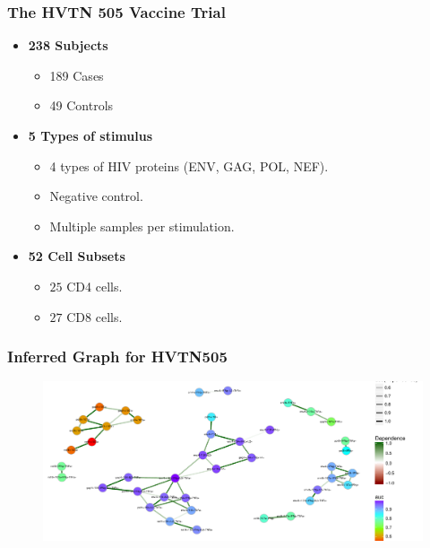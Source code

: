 \documentclass{beamer}
\makeatletter
\def\maxwidth{ %
  \ifdim\Gin@nat@width>\linewidth
    \linewidth
  \else
    \Gin@nat@width
  \fi
}
\theoremstyle{definition}
\makeatother
\begin{document}
\begin{frame}
\frametitle{The HVTN 505 Vaccine Trial}
\begin{itemize}
\item \textbf{238 Subjects}
	\begin{itemize}
	\item 189 Cases
	\item 49 Controls
	\end{itemize}
\vspace{0.4 cm}
\item \textbf{5 Types of stimulus} 
	\begin{itemize}
	\item 4 types of HIV proteins (ENV, GAG, POL, NEF).
	\item Negative control.
	\item Multiple samples per stimulation.
	\end{itemize}
\vspace{0.4 cm}
\item \textbf{52 Cell Subsets}
	\begin{itemize}
	\item $25$ CD4 cells.
	\item $27$ CD8 cells.
	\end{itemize} 
\end{itemize}
\end{frame}


\begin{frame}
\frametitle{Inferred Graph for HVTN505}
\begin{figure}[]
\includegraphics[width=\maxwidth]{figures/HVTNrobustNetwork}
\end{figure}
\end{frame}

\end{document}
